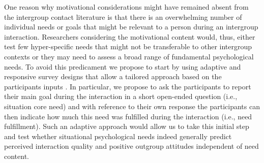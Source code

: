 \documentclass[man, 12pt, a4paper, mask]{apa7}
\theoremstyle{break}
\theoremstyle{plain}
\begin{document}
One reason why motivational considerations might have remained absent from the intergroup contact literature is that there is an overwhelming number of individual needs or goals that might be relevant to a person during an intergroup interaction. Researchers considering the motivational content would, thus, either test few hyper-specific needs that might not be transferable to other intergroup contexts or they may need to assess a broad range of fundamental psychological needs. To avoid this predicament we propose to start by using adaptive and responsive survey designs that allow a tailored approach based on the participants inputs \citep[e.g.,][]{Tourangeau2017}. In particular, we propose to ask the participants to report their main goal during the interaction in a short open-ended question (i.e., situation core need) and with reference to their own response the participants can then indicate how much this need was fulfilled during the interaction (i.e., need fulfillment). Such an adaptive approach would allow us to take this initial step and test whether situational psychological needs indeed generally predict perceived interaction quality and positive outgroup attitudes independent of need content. 
\end{document}
